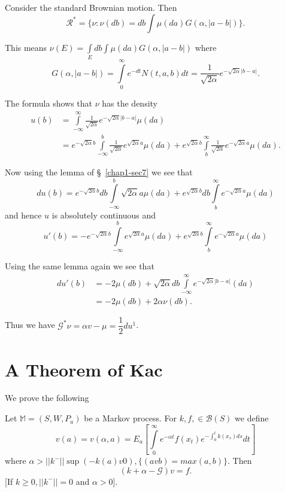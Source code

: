 \begin{example*}
Consider the standard Brownian motion. Then 
  $$
 \mathscr{R}^* = \{\nu: \nu(db) = db \int \mu (da) G( \alpha , | a-b | )\}.
  $$
 
This means $\nu (E) = \int\limits_E db \int \mu (da) G (\alpha , | a
  - b| )$ where  
$$
G(\alpha , | a - b| ) = \int\limits^ \infty_0  e^{-dt} N (t, a,
 b) dt = \frac{1}{\sqrt{2\alpha}} e^{-\sqrt{2 \alpha} | b - a|}. 
$$
 
The formula shows that $\nu$ has the density 
  \begin{align*}
    u (b) & = \int\limits^ \infty _{ - \infty} \frac{1}{\sqrt{2 \alpha
    }}e^{ - \sqrt{ 2 \alpha} | b - a|}\mu (da )\\ 
    & = e^{ - \sqrt{ 2 \alpha} b} \int\limits^b_{ - \infty}
    \frac{1}{\sqrt{ 2 \alpha}}e^{\sqrt{2\alpha}a} \mu (da) + e^{\sqrt{2 \alpha} b}
    \int\limits^ \infty_ b \frac{1}{\sqrt{2 \alpha}}e^{ -
      \sqrt{2\alpha} a} \mu (da).  
  \end{align*} 
 
Now using the lemma of \S\ \ref{chap1-sec7} we see that 
$$
du (b) = e^{ - \sqrt{ 2 \alpha} b} db \int\limits^b _{ - \infty} \sqrt{2\alpha}a\mu
(da) +e ^{ \sqrt{ 2 \alpha} b} db \int\limits^\infty_{b} e ^{ -
\sqrt{ 2 \alpha} a} \mu (da)  
$$
and hence $u$ is absolutely continuous and 
$$
u' (b) = -e^{ - \sqrt { 2 \alpha} b} \int\limits^b _{ - \infty} e^{ \sqrt{
2 \alpha }a} \mu (da) + e^{ \sqrt{ 2 \alpha} b} \int\limits
^\infty _b  e^{ - \sqrt{ 2 \alpha} a} \mu (da ) 
$$
 
Using the same lemma again we see that 
\begin{align*}
  du' (b) & = - 2 \mu (db) + \sqrt{ 2 \alpha } db \int\limits^ \infty
  _ { - \infty} e^{ - \sqrt{ 2 \alpha} | b- a|} (da)\\ 
  & =  -2 \mu (db) + 2 \alpha \nu (db). 
\end{align*}\pageoriginale
 
Thus we have $\mathscr{G}^* \nu =\alpha v - \mu = \dfrac{1}{2}du^1$.
\end{example*}

\section{A Theorem of Kac} %
 
We prove the following 
\begin{theorem*}[Kac]
  Let $\mathbb{M} = (S, W , P_a)$ be a Markov process. For $k, f , \in 
  \mathscr{B}(S)$  we define  
  $$
  v(a) = v(\alpha, a ) = E_a \left[\int \limits^\infty_0 e^{-\alpha t} f
  (x_t) e^{-\int^t_0k (x_s) ds} dt \right] 
  $$
  where $\alpha > || k ^- || \sup (-k (a) v 0), \{(avb) = max (a, b)\}$. Then 
  $$
  (k + \alpha - \mathscr{G})v = f. 
  $$
  [If $k \geq 0 , || k^- || = 0$ and $\alpha > 0$].
\end{theorem*}

